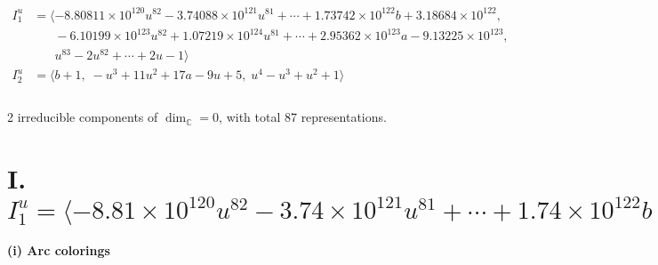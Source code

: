 \documentclass[1p]{elsarticle_modified}
\theoremstyle{definition}
\begin{document}
\begin{align*}
I^u_{1}&=\langle 
-8.80811\times10^{120} u^{82}-3.74088\times10^{121} u^{81}+\cdots+1.73742\times10^{122} b+3.18684\times10^{122},\\
\phantom{I^u_{1}}&\phantom{= \langle  }-6.10199\times10^{123} u^{82}+1.07219\times10^{124} u^{81}+\cdots+2.95362\times10^{123} a-9.13225\times10^{123},\\
\phantom{I^u_{1}}&\phantom{= \langle  }u^{83}-2 u^{82}+\cdots+2 u-1\rangle \\
I^u_{2}&=\langle 
b+1,\;- u^3+11 u^2+17 a-9 u+5,\;u^4- u^3+u^2+1\rangle \\
\\
\end{align*}
\raggedright * 2 irreducible components of $\dim_{\mathbb{C}}=0$, with total 87 representations.\\
\newpage
\renewcommand{\arraystretch}{1}
\centering \section*{I. $I^u_{1}= \langle -8.81\times10^{120} u^{82}-3.74\times10^{121} u^{81}+\cdots+1.74\times10^{122} b+3.19\times10^{122},\;-6.10\times10^{123} u^{82}+1.07\times10^{124} u^{81}+\cdots+2.95\times10^{123} a-9.13\times10^{123},\;u^{83}-2 u^{82}+\cdots+2 u-1 \rangle$}
\flushleft \textbf{(i) Arc colorings}\\
\end{document}
